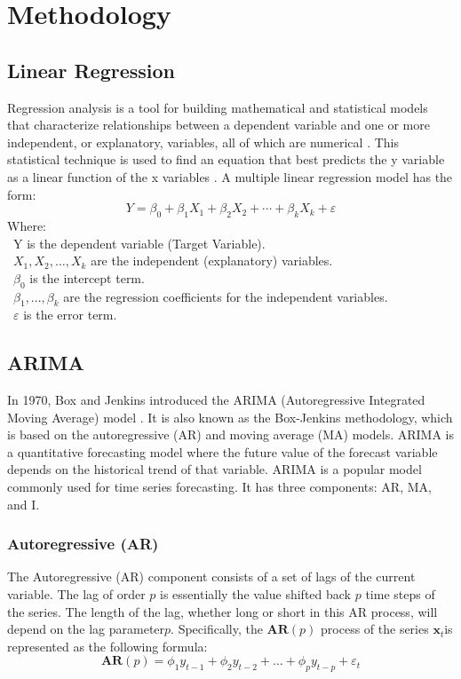 \documentclass{ieeeojies}
\begin{document}
\section{Methodology}
\subsection{Linear Regression}
Regression analysis is a tool for building mathematical and statistical models that characterize relationships between a dependent variable and one or more independent, or explanatory, variables, all of which are numerical \cite{b5}. This statistical technique  is used to find an equation that best predicts the y variable as a linear function of the x variables \cite{b6}.
A multiple linear regression model \cite{b7} has the form: 
\[Y=\beta_0+\beta_1X_1+\beta_2X_2+\cdots+\beta_kX_k+\varepsilon\]
Where:\\
	\indent\textbullet\ Y is the dependent variable (Target Variable).\\
	\indent\textbullet\ \(X_1, X_2, \ldots, X_k\) are the independent (explanatory) variables.\\
	\indent\textbullet\ \(\beta_0\) is the intercept term.\\
	\indent\textbullet\ \(\beta_1,..., \beta_k\) are the regression coefficients for the independent variables.\\
	\indent\textbullet\ \(\varepsilon\) is the error term.
\subsection{ARIMA}
In 1970, Box and Jenkins introduced the ARIMA (Autoregressive Integrated Moving Average) model \cite{b8}. It is also known as the Box-Jenkins methodology, which is based on the autoregressive (AR) and moving average (MA) models. ARIMA is a quantitative forecasting model where the future value of the forecast variable depends on the historical trend of that variable\cite{b9}.
ARIMA is a popular model commonly used for time series forecasting. It has three components: AR, MA, and I.
\subsubsection{Autoregressive (AR)}
The Autoregressive (AR) component consists of a set of lags of the current variable. The lag of order \(p\) is essentially the value shifted back \(p\) time steps of the series. The length of the lag, whether long or short in this AR process, will depend on the lag parameter\(p\)\cite{b10}. Specifically, the \(\mathbf {AR}(p)\) process of the series \(\mathbf x_t\)is represented as the following formula:
\[\mathbf {AR}(p) = \phi_1 y_{t-1} + \phi_2 y_{t-2} + \dots + \phi_p y_{t-p} + \varepsilon_t\]
\end{document}
